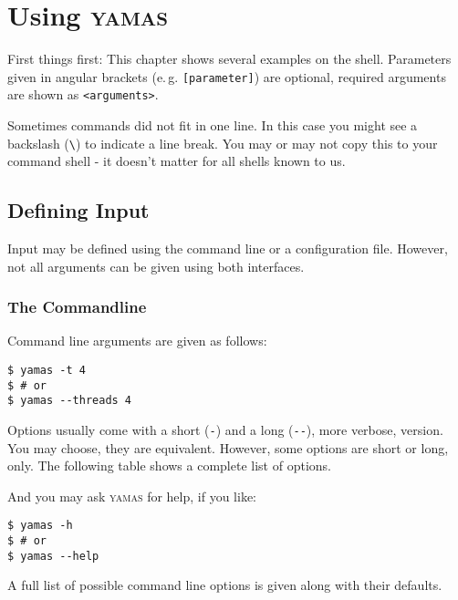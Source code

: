 \chapter[Usage]{Using \textsc{yamas}}

First things first: This chapter shows several examples on the shell. Parameters given in angular brackets (e.\,g. \texttt{[parameter]}) are optional, required arguments are shown as \texttt{<arguments>}.

Sometimes commands did not fit in one line. In this case you might see a backslash (\verb+\+) to indicate a line break. You may or may not copy this to your command shell - it doesn't matter for all shells known to us.

\section{Defining Input}

Input may be defined using the command line or a configuration file. However, not all arguments can be given using both interfaces.

\subsection{The Commandline}

Command line arguments are given as follows:

\begin{lstlisting}[style=shell]
$ yamas -t 4
$ # or
$ yamas --threads 4
\end{lstlisting}

Options usually come with a short (\verb+-+) and a long (\verb+--+), more verbose, version. You may choose, they are equivalent. However, some options are short or long, only. The following table shows a complete list of options.

And you may ask \textsc{yamas} for help, if you like:
\begin{lstlisting}[style=shell]
$ yamas -h
$ # or
$ yamas --help
\end{lstlisting}
A full list of possible command line options is given along with their defaults.\\

